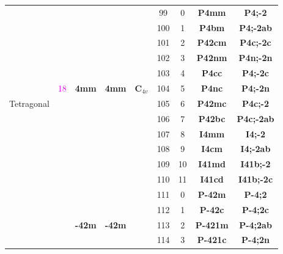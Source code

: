 \documentclass{article}      %
\begin{document}
\begin{small}
\begin{longtable}[c]{|c|c|c|c|c|c|c|c|c|}
          & & & & &\textrm{99} &\textrm{0} &\textbf{P4mm}         &\textbf{P4;-2}\\\cline{6-9}         
          & & & & &\textrm{100}  &\textrm{1} &\textbf{P4bm}         &\textbf{P4;-2ab}\\\cline{6-9}      
          & & & & &\textrm{101}  &\textrm{2} &\textbf{P42cm}       &\textbf{P4c;-2c}\\\cline{6-9}       
          & & & & &\textrm{102}  &\textrm{3} &\textbf{P42nm}       &\textbf{P4n;-2n}\\\cline{6-9}       
          & & & & &\textrm{103}  &\textrm{4} &\textbf{P4cc}         &\textbf{P4;-2c}\\\cline{6-9}       
	  & \textrm{\textcolor{magenta}{18}} &\textbf{4mm} &\textbf{4mm} &$\mathbf{C}_{4v}$ &\textrm{104} &\textrm{5} &\textbf{P4nc}  &\textbf{P4;-2n}\\\cline{6-9}
  \textrm{Tetragonal}  & & & & &\textrm{105}  &\textrm{6} &\textbf{P42mc}       &\textbf{P4c;-2}\\\cline{6-9}        
          & & & & &\textrm{106}  &\textrm{7} &\textbf{P42bc}       &\textbf{P4c;-2ab}\\\cline{6-9}      
          & & & & &\textrm{107}  &\textrm{8} &\textbf{I4mm}         &\textbf{I4;-2}\\\cline{6-9}        
          & & & & &\textrm{108}  &\textrm{9} &\textbf{I4cm}         &\textbf{I4;-2ab}\\\cline{6-9}      
          & & & & &\textrm{109}  &\textrm{10} &\textbf{I41md}       &\textbf{I41b;-2}\\\cline{6-9}       
          & & & & &\textrm{110}  &\textrm{11} &\textbf{I41cd}       &\textbf{I41b;-2c}\\\cline{2-9}      
          & & & & &\textrm{111}  &\textrm{0} &\textbf{P-42m}       &\textbf{P-4;2}\\\cline{6-9}         
          & & & & &\textrm{112}  &\textrm{1} &\textbf{P-42c}       &\textbf{P-4;2c}\\\cline{6-9}        
          & & \textbf{-42m} & \textbf{-42m} & &\textrm{113}  &\textrm{2} &\textbf{P-421m}     &\textbf{P-4;2ab}\\\cline{6-9}        
          & & & & &\textrm{114}  &\textrm{3} &\textbf{P-421c}     &\textbf{P-4;2n}\\\cline{6-9}         

\end{longtable}
\end{small}
\end{document}
